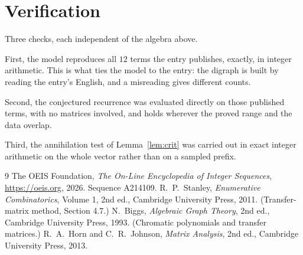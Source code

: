 \documentclass[11pt,a4paper]{article}
\theoremstyle{plain}
\theoremstyle{definition}
\begin{document}
\section{Verification}

Three checks, each independent of the algebra above.

First, the model reproduces all $12$ terms the entry publishes, exactly, in integer
arithmetic. This is what ties the model to the entry: the digraph is built by reading the
entry's English, and a misreading gives different counts.

Second, the conjectured recurrence was evaluated directly on those published terms, with no
matrices involved, and holds wherever the proved range and the data overlap.

Third, the annihilation test of Lemma~\ref{lem:crit} was carried out in exact integer
arithmetic on the whole vector rather than on a sampled prefix.

\begin{thebibliography}{9}
 The OEIS Foundation, \emph{The On-Line Encyclopedia of Integer
Sequences}, \url{https://oeis.org}, 2026. Sequence A214109.
 R.~P.~Stanley, \emph{Enumerative Combinatorics}, Volume 1, 2nd ed.,
Cambridge University Press, 2011. (Transfer-matrix method, Section 4.7.)
 N.~Biggs, \emph{Algebraic Graph Theory}, 2nd ed., Cambridge University
Press, 1993. (Chromatic polynomials and transfer matrices.)
 R.~A.~Horn and C.~R.~Johnson, \emph{Matrix Analysis}, 2nd ed., Cambridge
University Press, 2013.
\end{thebibliography}
\end{document}
